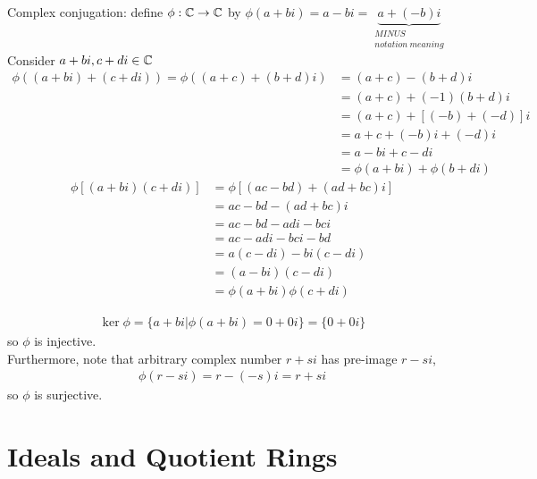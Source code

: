 \begin{example}
Complex conjugation: define $\phi : {\mathbb{ C}} \rightarrow {\mathbb{ C}} $ by $\phi(a+bi)=a-bi= \underset{\substack{MINUS \\ notation \ meaning}}{\underbrace{a+(-b)i}}$ \steezybreak\\
Consider $a+bi, c+di \in {\mathbb{ C}}$
\begin{align}
    \phi((a+bi)+(c+di))= \phi((a+c)+(b+d)i)&= (a+c)-(b+d)i \nonumber \\
    &= (a+c)+(-1)(b+d)i \nonumber \\
    &= (a+c)+[(-b)+(-d)]i \nonumber \\
    &= a+c +(-b)i+(-d)i \nonumber \\
    &= a-bi + c-di \nonumber \\
    &= \phi(a+bi)+\phi(b+di) \nonumber
\end{align}
\begin{align}
    \phi[(a+bi)(c+di)]&=\phi[(ac-bd)+(ad+bc)i] \nonumber \\
    &= ac-bd-(ad+bc)i \nonumber \\
    &= ac-bd-adi-bci \nonumber \\
    &= ac-adi -bci-bd \nonumber \\
    &= a(c-di)-bi(c-di) \nonumber \\
    &= (a-bi)(c-di) \nonumber \\
    &=\phi(a+bi)\phi(c+di) \nonumber 
\end{align}

\begin{align}
    \ker\phi = \{a+bi | \phi(a+bi)=0+0i\} = \{0+0i\} \nonumber
\end{align}
so $\phi$ is injective. \steezybreak\\ Furthermore, note that arbitrary complex number $r+si$ has pre-image $r-si$, 
\begin{align}
    \phi(r-si)=r-(-s)i=r+si \nonumber
\end{align}
so $\phi$ is surjective.
\end{example}
\section{Ideals and Quotient Rings}

